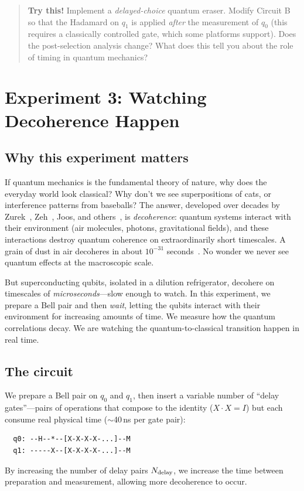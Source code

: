 \documentclass[amsmath,amssymb,reprint,aps,prb]{revtex4-2}
\begin{document}
\begin{quote}
\textbf{Try this!}  Implement a \emph{delayed-choice} quantum
eraser.  Modify Circuit B so that the Hadamard on $q_1$ is applied
\emph{after} the measurement of $q_0$ (this requires a classically
controlled gate, which some platforms support).  Does the
post-selection analysis change?  What does this tell you about the
role of timing in quantum mechanics?
\end{quote}


\section{Experiment 3: Watching Decoherence Happen}
\label{sec:decoherence}

\subsection{Why this experiment matters}

If quantum mechanics is the fundamental theory of nature, why
does the everyday world look classical?  Why don't we see
superpositions of cats, or interference patterns from baseballs?
The answer, developed over decades by
Zurek~\cite{Zurek2003}, Zeh~\cite{Zeh1970}, Joos, and
others~\cite{Schlosshauer2007}, is \emph{decoherence}: quantum
systems interact with their environment (air molecules, photons,
gravitational fields), and these interactions destroy quantum
coherence on extraordinarily short timescales.  A grain of dust
in air decoheres in about $10^{-31}$
seconds~\cite{Schlosshauer2007}.  No wonder we never see quantum
effects at the macroscopic scale.

But superconducting qubits, isolated in a dilution refrigerator,
decohere on timescales of \emph{microseconds}---slow enough to
watch.  In this experiment, we prepare a Bell pair and then
\emph{wait}, letting the qubits interact with their environment
for increasing amounts of time.  We measure how the quantum
correlations decay.  We are watching the quantum-to-classical
transition happen in real time.

\subsection{The circuit}

We prepare a Bell pair on $q_0$ and $q_1$, then insert a variable
number of ``delay gates''---pairs of operations that compose to the
identity ($X \cdot X = I$) but each consume real physical time
($\sim$40\,ns per gate pair):
\begin{verbatim}
  q0: --H--*--[X-X-X-X-...]--M
  q1: -----X--[X-X-X-X-...]--M
\end{verbatim}
By increasing the number of delay pairs $N_{\rm delay}$, we
increase the time between preparation and measurement, allowing
more decoherence to occur.
\end{document}
